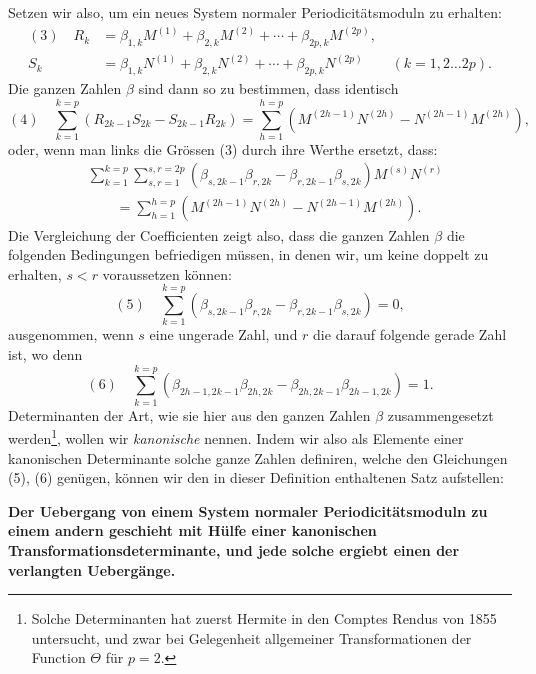\documentclass[10pt]{article}
\begin{document}
Setzen wir also, um ein neues System normaler Periodicitätsmoduln zu erhalten:
\[
\begin{aligned}
(3)\quad
R_k&=\beta_{1,k}M^{(1)}+\beta_{2,k}M^{(2)}+\cdots+\beta_{2p,k}M^{(2p)},\\
S_k&=\beta_{1,k}N^{(1)}+\beta_{2,k}N^{(2)}+\cdots+\beta_{2p,k}N^{(2p)}
\qquad (k=1,2\ldots2p).
\end{aligned}
\]
Die ganzen Zahlen \(\beta\) sind dann so zu bestimmen, dass identisch
\[
(4)\quad
\sum_{k=1}^{k=p}(R_{2k-1}S_{2k}-S_{2k-1}R_{2k})
=\sum_{h=1}^{h=p}\left(M^{(2h-1)}N^{(2h)}-N^{(2h-1)}M^{(2h)}\right),
\]
oder, wenn man links die Grössen (3) durch ihre Werthe ersetzt, dass:
\[
\begin{aligned}
&\sum_{k=1}^{k=p}\sum_{s,r=1}^{s,r=2p}
(\beta_{s,2k-1}\beta_{r,2k}-\beta_{r,2k-1}\beta_{s,2k})M^{(s)}N^{(r)}\\
&\hspace{2em}=\sum_{h=1}^{h=p}\left(M^{(2h-1)}N^{(2h)}-N^{(2h-1)}M^{(2h)}\right).
\end{aligned}
\]
Die Vergleichung der Coefficienten zeigt also, dass die ganzen Zahlen \(\beta\) die folgenden Bedingungen befriedigen müssen, in denen wir, um keine doppelt zu erhalten, \(s<r\) voraussetzen können:
\[
(5)\quad
\sum_{k=1}^{k=p}\left(\beta_{s,2k-1}\beta_{r,2k}-\beta_{r,2k-1}\beta_{s,2k}\right)=0,
\]
ausgenommen, wenn \(s\) eine ungerade Zahl, und \(r\) die darauf folgende gerade Zahl ist, wo denn
\[
(6)\quad
\sum_{k=1}^{k=p}\left(\beta_{2h-1,2k-1}\beta_{2h,2k}-\beta_{2h,2k-1}\beta_{2h-1,2k}\right)=1.
\]
Determinanten der Art, wie sie hier aus den ganzen Zahlen \(\beta\) zusammengesetzt werden\footnote{Solche Determinanten hat zuerst Hermite in den Comptes Rendus von 1855 untersucht, und zwar bei Gelegenheit allgemeiner Transformationen der Function \(\Theta\) für \(p=2\).}, wollen wir \emph{kanonische} nennen. Indem wir also als Elemente einer kanonischen Determinante solche ganze Zahlen definiren, welche den Gleichungen (5), (6) genügen, können wir den in dieser Definition enthaltenen Satz aufstellen:

\begin{center}
\textbf{Der Uebergang von einem System normaler Periodicitätsmoduln zu einem andern geschieht mit Hülfe einer kanonischen Transformationsdeterminante, und jede solche ergiebt einen der verlangten Uebergänge.}
\end{center}
\end{document}
